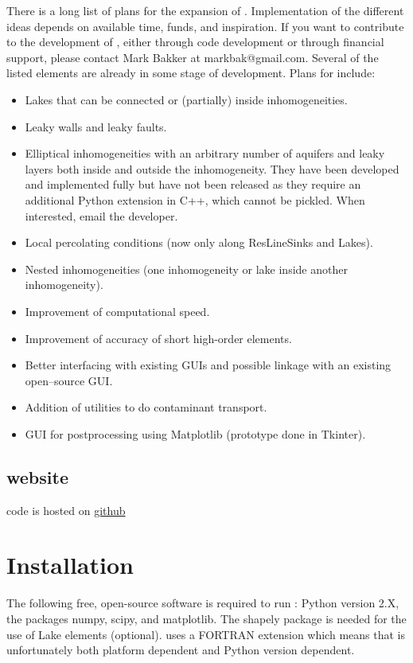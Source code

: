 \documentclass [10pt,letterpaper] {article}
\begin{document}
There is a long list of plans for the expansion of \Tim.
Implementation of the
different ideas depends on available time, funds, and
inspiration. If you want to contribute to the development
of \Tim, either through code development or through
financial support, please contact Mark Bakker at
markbak@gmail.com. Several of the listed elements are
already in some stage of development. Plans for \Timsp include:
\begin{itemize}
\item Lakes that can be connected or (partially) inside inhomogeneities.
\item Leaky walls and leaky faults.
\item Elliptical inhomogeneities with an arbitrary
number of aquifers and leaky layers both inside and outside the
inhomogeneity. They have been developed and implemented fully but have not been
released as they require an additional Python extension in C++, which cannot be pickled. When interested,
email the developer.
\item Local percolating conditions (now only along ResLineSinks and Lakes).
\item Nested inhomogeneities (one inhomogeneity or lake inside another inhomogeneity).
\item Improvement of computational speed.
\item Improvement of accuracy of short high-order elements.
\item Better interfacing with existing GUIs and possible linkage with an existing open--source GUI.
\item Addition of utilities to do
contaminant transport.
\item GUI for postprocessing using Matplotlib (prototype done in Tkinter).
\end{itemize}

\subsection{\Timsp website}
\Timsp code is hosted on \url{github}

\newpage
\section{Installation}
The following free, open-source software is required to run \Tim:
Python version 2.X, the packages numpy, scipy, and matplotlib. The shapely package is needed for the use of Lake elements (optional). \Timsp uses a FORTRAN extension which means that \Timsp is unfortunately both platform dependent
and Python version dependent. 
\end{document}
